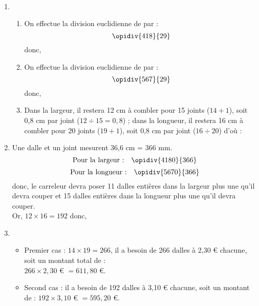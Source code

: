\ \\ [-5mm]
\begin{enumerate}
   \item
   \begin{enumerate}
      \item On effectue la division euclidienne de  par  :
      $$\opidiv{418}{29}$$
      donc, 
      \item On effectue la division euclidienne de  par  :
      $$\opidiv{567}{29}$$
      donc, 
      \item Dans la largeur, il restera 12 cm à combler pour 15 joints ($14+1$), soit  0,8 cm par joint ($12\div15 =0,8$) ; dans la longueur, il restera 16 cm à combler pour $20$ joints ($19+1$), soit 0,8 cm par joint ($16\div20$) d'où : \\
   \end{enumerate}
   \item Une dalle et un joint mesurent 36,6 cm = 366 mm.
   $$\text{Pour la largeur :} \quad \opidiv{4180}{366}$$
   $$\text{Pour la longueur :} \quad  \opidiv{5670}{366}$$
   donc, le carreleur devra poser 11 dalles entières dans la largeur plus une qu'il devra couper et 15 dalles entières dans la longueur plus une qu'il devra couper. \\
    Or, $12\times16 =192$ donc, 
   \item
   \begin{itemize}
      \item Premier cas : $14\times19 =266$, il a besoin de 266 dalles à 2,30 \euro{} chacune, soit un montant total de : \\
      $266\times2,30$ \euro{}  $=611,80$ \euro{}.
      \item Second cas : il a besoin de 192 dalles à 3,10 \euro{} chacune, soit un montant de : $192\times3,10$ \euro{} $=595,20$ \euro{}.
   \end{itemize}
\end{enumerate}
